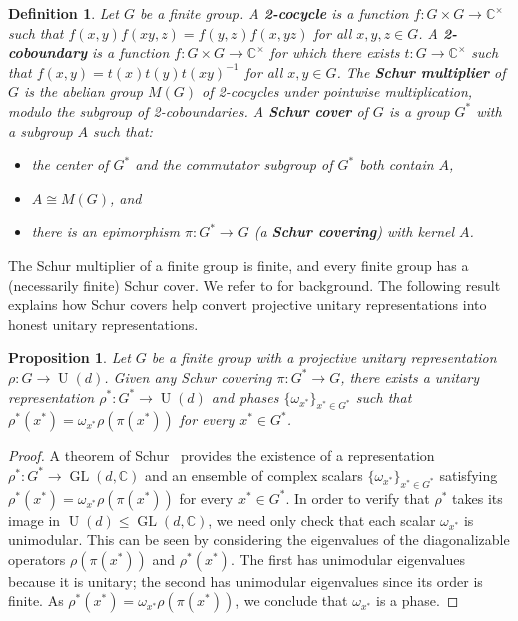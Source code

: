 \documentclass[11pt]{article}
\newtheorem{proposition}[theo]{Proposition}
\newtheorem{definition}[theo]{Definition}
\theoremstyle{definition}
\numberwithin{equation}{section}
\begin{document}
\begin{definition}
Let $G$ be a finite group.
A \textbf{2-cocycle} is a function $f \colon G \times G \to \mathbb{C}^\times$ such that $f(x,y) f(xy,z) = f(y,z) f(x,yz)$ for all $x,y,z \in G$.
A \textbf{2-coboundary} is a function $f \colon G \times G \to \mathbb{C}^\times$ for which there exists $t \colon G \to \mathbb{C}^\times$ such that $f(x,y) = t(x)t(y)t(xy)^{-1}$ for all $x,y \in G$.
The \textbf{Schur multiplier} of $G$ is the abelian group $M(G)$ of 2-cocycles under pointwise multiplication, modulo the subgroup of 2-coboundaries. 
A \textbf{Schur cover} of $G$ is a group $G^*$ with a subgroup $A$ such that:
\begin{itemize}
\item[(i)] the center of $G^*$ and the commutator subgroup of $G^*$ both contain $A$,
\item[(ii)] $A \cong M(G)$, and
\item[(iii)] there is an epimorphism $\pi \colon G^* \to G$ (a \textbf{Schur covering}) with kernel $A$.
\end{itemize}
\end{definition}

The Schur multiplier of a finite group is finite, and every finite group has a (necessarily finite) Schur cover.
We refer to \cite{Karpilovsky:85,Karpilovsky:87} for background.
The following result explains how Schur covers help convert projective unitary representations into honest unitary representations.

\begin{proposition}
\label{prop: make honest}
Let $G$ be a finite group with a projective unitary representation $\rho \colon G \to \operatorname{U}(d)$.
Given any Schur covering $\pi \colon G^* \to G$, there exists a unitary representation $\rho^* \colon G^* \to \operatorname{U}(d)$ and phases $\{ \omega_{x^*} \}_{x^* \in G^*}$ such that $\rho^*(x^*) = \omega_{x^*} \rho(\pi(x^*))$ for every $x^* \in G^*$.
\end{proposition}

\begin{proof}
A theorem of Schur~\cite[Lemma~3.1]{Karpilovsky:85} provides the existence of a representation $\rho^* \colon G^* \to \operatorname{GL}(d,
\mathbb{C})$ and an ensemble of complex scalars $\{ \omega_{x^*} \}_{x^* \in G^*}$ satisfying $\rho^*(x^*) = \omega_{x^*} \rho( \pi( x^* ) )$ for every $x^* \in G^*$.
In order to verify that $\rho^*$ takes its image in $\operatorname{U}(d) \leq \operatorname{GL}(d,\mathbb{C})$, we need only check that each scalar $\omega_{x^*}$ is unimodular.
This can be seen by considering the eigenvalues of the diagonalizable operators $\rho( \pi( x^*) )$ and $\rho^* ( x^* )$.
The first has unimodular eigenvalues because it is unitary; the second has unimodular eigenvalues since its order is finite.
As $\rho^*(x^*) = \omega_{x^*} \rho( \pi( x^* ) )$, we conclude that $\omega_{x^*}$ is a phase.
\end{proof}
\end{document}
